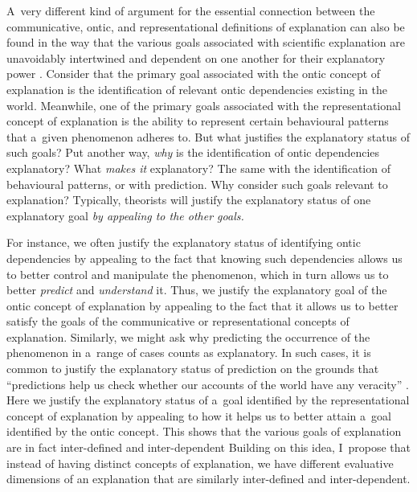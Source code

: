 A~very different kind of argument for the essential connection between the communicative, ontic, and representational definitions of explanation can also be found in the way that the various goals associated with scientific explanation are unavoidably intertwined and dependent on one another for their explanatory power
\parencite[][]{hochstein_why_2017}. %
 Consider that the primary goal associated with the ontic concept of explanation is the identification of relevant ontic dependencies existing in the world. Meanwhile, one of the primary goals associated with the representational concept of explanation is the ability to represent certain behavioural patterns that a~given phenomenon adheres to. But what justifies the explanatory status of such goals? Put another way, \textit{why} is the identification of ontic dependencies explanatory? What \textit{makes it} explanatory? The same with the identification of behavioural patterns, or with prediction. Why consider such goals relevant to explanation? Typically, theorists will justify the explanatory status of one explanatory goal \textit{by appealing to the other goals.}

For instance, we often justify the explanatory status of identifying ontic dependencies by appealing to the fact that knowing such dependencies allows us to better control and manipulate the phenomenon, which in turn allows us to better \textit{predict} and \textit{understand} it. Thus, we justify the explanatory goal of the ontic concept of explanation by appealing to the fact that it allows us to better satisfy the goals of the communicative or representational concepts of explanation. Similarly, we might ask why predicting the occurrence of the phenomenon in a~range of cases counts as explanatory. In such cases, it is common to justify the explanatory status of prediction on the grounds that ``predictions help us check whether our accounts of the world have any veracity''
\parencite[][p.453]{douglas_reintroducing_2009}. %
 Here we justify the explanatory status of a~goal identified by the representational concept of explanation by appealing to how it helps us to better attain a~goal identified by the ontic concept. This shows that the various goals of explanation are in fact inter-defined and inter-dependent 
 Building on this idea, I~propose that instead of having distinct concepts of explanation, we have different evaluative dimensions of an explanation that are similarly inter-defined and inter-dependent.

